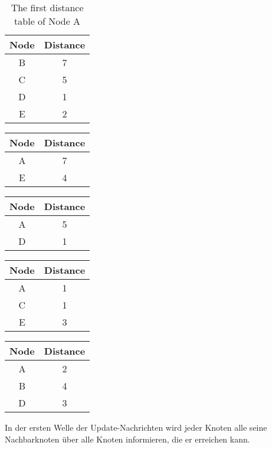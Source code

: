 \documentclass{article}
\begin{document}

\begin{table}
\begin{tabular}{c|c}
Node & Distance \\
\hline
B & 7\\
C & 5\\
D & 1\\
E & 2
\end{tabular}
\caption{The first distance table of Node A}
\end{table}

\begin{tabular}{c|c}
Node & Distance \\ \hline A & 7 \\ E & 4
\end{tabular}

\begin{tabular}{c|c}
Node & Distance \\ \hline A & 5 \\ D & 1
\end{tabular}

\begin{tabular}{c|c}
Node & Distance \\ \hline A & 1 \\ C & 1 \\ E & 3
\end{tabular}

\begin{tabular}{c|c}
Node & Distance \\ \hline A & 2 \\ B & 4 \\ D & 3
\end{tabular}

In der ersten Welle der Update-Nachrichten wird jeder Knoten alle seine Nachbarknoten über alle Knoten informieren, die er erreichen kann.
\end{document}
